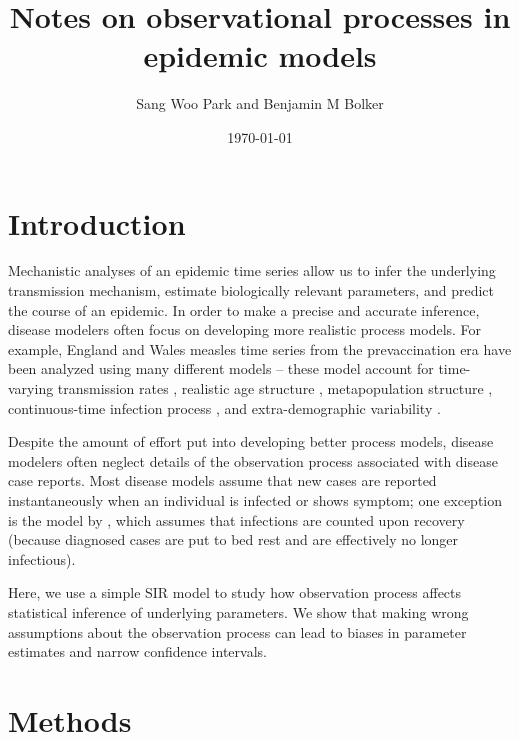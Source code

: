 \documentclass{article}\usepackage[]{graphicx}\usepackage[]{color}
\title{Notes on observational processes in epidemic models}
\author{Sang Woo Park and Benjamin M Bolker}
\date{\today}
\begin{document}
\maketitle

\section{Introduction}

Mechanistic analyses of an epidemic time series allow us to infer the underlying 
transmission mechanism, estimate biologically relevant parameters, and 
predict the course of an epidemic. In order to make a precise and accurate inference, 
disease modelers often focus on developing more realistic process models. For example,
England and Wales measles time series from the prevaccination era have been analyzed
using many different models -- these model account for time-varying transmission
rates \citep{fine1982measles}, realistic age structure \citep{schenzle1984age},
metapopulation structure \citep{xia2004measles}, continuous-time infection process 
\citep{cauchemez2008likelihood}, and extra-demographic variability \citep{he2009plug}. 

Despite the amount of effort put into developing better process models, disease 
modelers often neglect details of the observation process associated with disease
case reports. Most disease models assume that new cases are reported
instantaneously when an individual is infected or shows symptom; one exception is
the model by \citep{he2009plug}, which assumes that infections are counted upon
recovery (because diagnosed cases are put to bed rest and are effectively 
no longer infectious).

Here, we use a simple SIR model to study how observation process affects statistical
inference of underlying parameters. We show that making wrong assumptions about
the observation process can lead to biases in parameter estimates and narrow 
confidence intervals.

\section{Methods}
\end{document}
